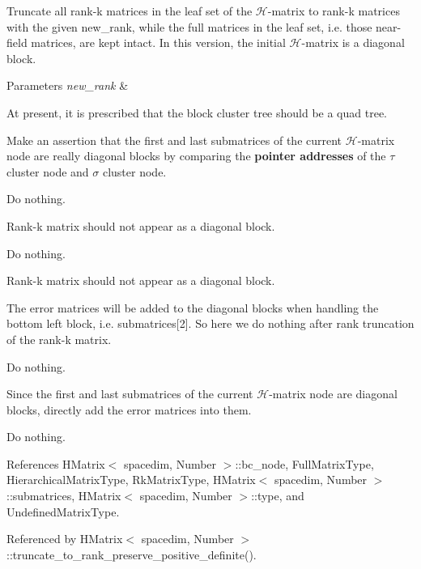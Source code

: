 Truncate all rank-\/k matrices in the leaf set of the $\mathcal{H}$-\/matrix to rank-\/k matrices with the given {\ttfamily new\+\_\+rank}, while the full matrices in the leaf set, i.\+e. those near-\/field matrices, are kept intact. In this version, the initial $\mathcal{H}$-\/matrix is a diagonal block.


\begin{DoxyParams}{Parameters}
{\em new\+\_\+rank} & \\
\hline
\end{DoxyParams}
At present, it is prescribed that the block cluster tree should be a quad tree.

Make an assertion that the first and last submatrices of the current $\mathcal{H}$-\/matrix node are really diagonal blocks by comparing the {\bfseries pointer addresses} of the $\tau$ cluster node and $\sigma$ cluster node.

Do nothing.

Rank-\/k matrix should not appear as a diagonal block.

Do nothing.

Rank-\/k matrix should not appear as a diagonal block.

The error matrices will be added to the diagonal blocks when handling the bottom left block, i.\+e. {\ttfamily submatrices}\mbox{[}2\mbox{]}. So here we do nothing after rank truncation of the rank-\/k matrix.

Do nothing.

Since the first and last submatrices of the current $\mathcal{H}$-\/matrix node are diagonal blocks, directly add the error matrices into them.

Do nothing.

References H\+Matrix$<$ spacedim, Number $>$\+::bc\+\_\+node, Full\+Matrix\+Type, Hierarchical\+Matrix\+Type, Rk\+Matrix\+Type, H\+Matrix$<$ spacedim, Number $>$\+::submatrices, H\+Matrix$<$ spacedim, Number $>$\+::type, and Undefined\+Matrix\+Type.



Referenced by H\+Matrix$<$ spacedim, Number $>$\+::truncate\+\_\+to\+\_\+rank\+\_\+preserve\+\_\+positive\+\_\+definite().

\mbox{\label{classHMatrix_a88546d9ca48a3c1a2a0874545cc4c8df}} 
